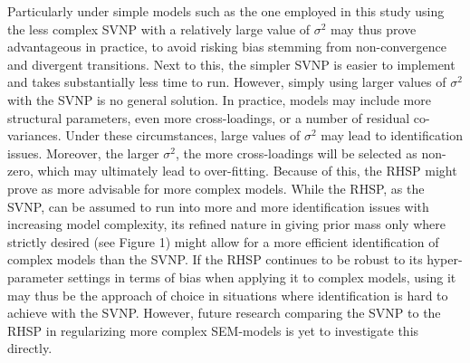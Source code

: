 \documentclass[
  man, donotrepeattitle,floatsintext]{apa6}
\begin{document}
Particularly under simple models such as the one employed in this study using the less complex SVNP with a relatively large value of \(\sigma^2\) may thus prove advantageous in practice, to avoid risking bias stemming from non-convergence and divergent transitions. Next to this, the simpler SVNP is easier to implement and takes substantially less time to run. However, simply using larger values of \(\sigma^2\) with the SVNP is no general solution. In practice, models may include more structural parameters, even more cross-loadings, or a number of residual co-variances. Under these circumstances, large values of \(\sigma^2\) may lead to identification issues. Moreover, the larger \(\sigma^2\), the more cross-loadings will be selected as non-zero, which may ultimately lead to over-fitting. Because of this, the RHSP might prove as more advisable for more complex models. While the RHSP, as the SVNP, can be assumed to run into more and more identification issues with increasing model complexity, its refined nature in giving prior mass only where strictly desired (see Figure 1) might allow for a more efficient identification of complex models than the SVNP. If the RHSP continues to be robust to its hyper-parameter settings in terms of bias when applying it to complex models, using it may thus be the approach of choice in situations where identification is hard to achieve with the SVNP. However, future research comparing the SVNP to the RHSP in regularizing more complex SEM-models is yet to investigate this directly.
\end{document}
